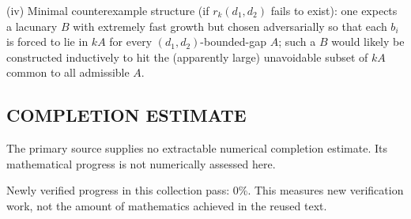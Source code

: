 (iv) Minimal counterexample structure (if \(r_k(d_1,d_2)\) fails to exist): one expects a lacunary \(B\) with extremely fast growth but chosen adversarially so that each \(b_i\) is forced to lie in \(kA\) for every \((d_1,d_2)\)-bounded-gap \(A\); such a \(B\) would likely be constructed inductively to hit the (apparently large) unavoidable subset of \(kA\) common to all admissible \(A\).




\subsection*{COMPLETION ESTIMATE}
The primary source supplies no extractable numerical completion estimate. Its mathematical progress is not numerically assessed here.

Newly verified progress in this collection pass: $0\%$. This measures new verification work, not the amount of mathematics achieved in the reused text.
